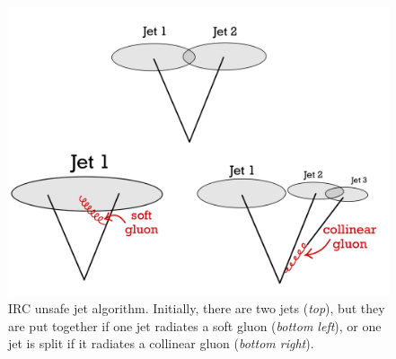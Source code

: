 \begin{figure}[htb]
    \centering
    \includegraphics[width=0.7\linewidth]{src/img/IRC_unsafe.jpeg}
    \caption{IRC unsafe jet algorithm. Initially, there are two jets (\emph{top}), but they are put together if one jet radiates a soft gluon (\emph{bottom left}), or one jet is split if it radiates a collinear gluon (\emph{bottom right}).}
    \label{fig:collinear_safety}
\end{figure}
